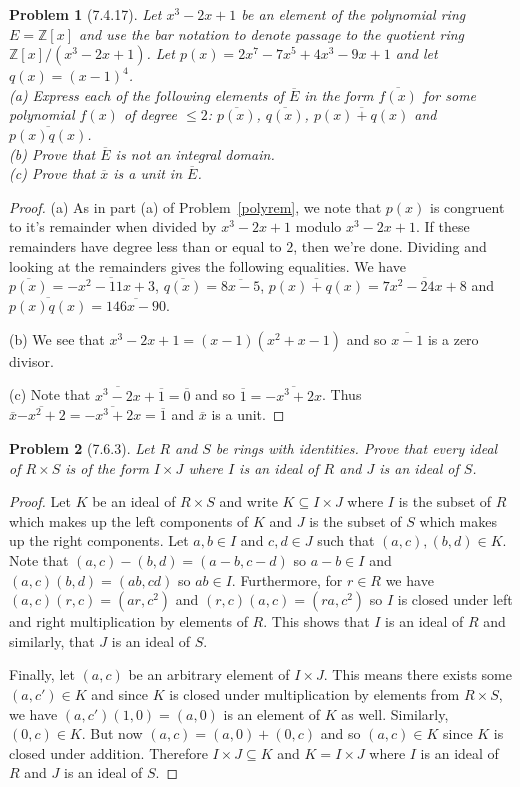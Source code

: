 \documentclass{article}
\newtheorem{problem}{Problem}
\begin{document}
\begin{problem}[7.4.17]
Let $x^3 - 2x + 1$ be an element of the polynomial ring $E = \mathbb{Z}[x]$ and use the bar notation to denote passage to the quotient ring $\mathbb{Z}[x]/(x^3-2x+1)$. Let $p(x) = 2x^7 - 7x^5 + 4x^3 - 9x + 1$ and let $q(x) = (x-1)^4$.\\
(a) Express each of the following elements of $\overline{E}$ in the form $\overline{f(x)}$ for some polynomial $f(x)$ of degree $\leq 2$: $\overline{p(x)}$, $\overline{q(x)}$, $\overline{p(x) + q(x)}$ and $\overline{p(x)q(x)}$.\\
(b) Prove that $\overline{E}$ is not an integral domain.\\
(c) Prove that $\overline{x}$ is a unit in $\overline{E}$.
\end{problem}
\begin{proof}
(a) As in part (a) of Problem~\ref{polyrem}, we note that $p(x)$ is congruent to it's remainder when divided by $x^3 - 2x + 1$ modulo $x^3 - 2x + 1$. If these remainders have degree less than or equal to $2$, then we're done. Dividing and looking at the remainders gives the following equalities. We have $\overline{p(x)} = \overline{-x^2 - 11x + 3}$, $\overline{q(x)} = \overline{8x - 5}$, $\overline{p(x) + q(x)} = \overline{7x^2 - 24x + 8}$ and $\overline{p(x)q(x)} = \overline{146x - 90}$.

(b) We see that $x^3 - 2x + 1 = (x-1)(x^2 + x - 1)$ and so $\overline{x-1}$ is a zero divisor.

(c) Note that $\overline{x^3 - 2x} + \overline{1} = \overline{0}$ and so $\overline{1} = \overline{-x^3 + 2x}$. Thus $\overline{x}\overline{-x^2 + 2} = \overline{-x^3 + 2x} = \overline{1}$ and $\overline{x}$ is a unit.
\end{proof}

\begin{problem}[7.6.3]
Let $R$ and $S$ be rings with identities. Prove that every ideal of $R \times S$ is of the form $I \times J$ where $I$ is an ideal of $R$ and $J$ is an ideal of $S$.
\end{problem}
\begin{proof}
Let $K$ be an ideal of $R \times S$ and write $K \subseteq I \times J$ where $I$ is the subset of $R$ which makes up the left components of $K$ and $J$ is the subset of $S$ which makes up the right components. Let $a,b \in I$ and $c,d \in J$ such that $(a,c),(b,d) \in K$. Note that $(a,c) - (b,d) = (a-b,c-d)$ so $a-b \in I$ and $(a,c)(b,d) = (ab,cd)$ so $ab \in I$. Furthermore, for $r \in R$ we have $(a,c)(r,c) = (ar,c^2)$ and $(r,c)(a,c) = (ra,c^2)$ so $I$ is closed under left and right multiplication by elements of $R$. This shows that $I$ is an ideal of $R$ and similarly, that $J$ is an ideal of $S$.

Finally, let $(a,c)$ be an arbitrary element of $I \times J$. This means there exists some $(a,c') \in K$ and since $K$ is closed under multiplication by elements from $R \times S$, we have $(a,c')(1,0) = (a,0)$ is an element of $K$ as well. Similarly, $(0,c) \in K$. But now $(a,c) = (a,0) + (0,c)$ and so $(a,c) \in K$ since $K$ is closed under addition. Therefore $I \times J \subseteq K$ and $K = I \times J$ where $I$ is an ideal of $R$ and $J$ is an ideal of $S$.
\end{proof}
\end{document}
